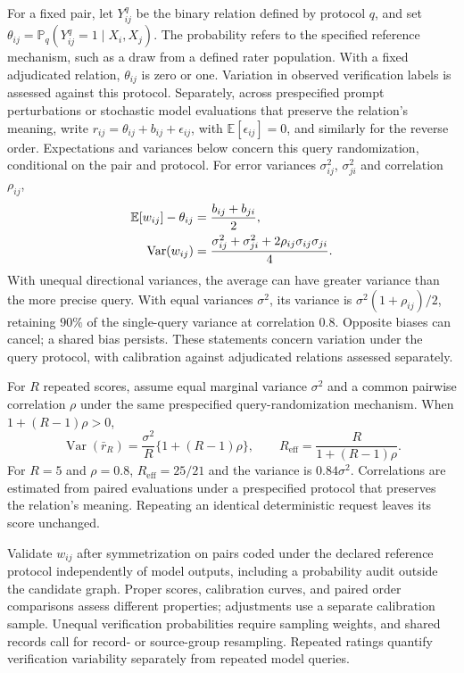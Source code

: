 \documentclass[11pt,a4paper]{article}
\newcommand{\E}{\mathbb{E}}
\newcommand{\Prob}{\mathbb{P}}
\newcommand{\Var}{\operatorname{Var}}
\begin{document}
For a fixed pair, let $Y^q_{ij}$ be the binary relation defined by protocol $q$, and set $\theta_{ij}=\Prob_q(Y^q_{ij}=1\mid X_i,X_j)$. The probability refers to the specified reference mechanism, such as a draw from a defined rater population. With a fixed adjudicated relation, $\theta_{ij}$ is zero or one. Variation in observed verification labels is assessed against this protocol. Separately, across prespecified prompt perturbations or stochastic model evaluations that preserve the relation's meaning, write $r_{ij}=\theta_{ij}+b_{ij}+\epsilon_{ij}$, with $\E[\epsilon_{ij}]=0$, and similarly for the reverse order. Expectations and variances below concern this query randomization, conditional on the pair and protocol. For error variances $\sigma_{ij}^2$, $\sigma_{ji}^2$ and correlation $\rho_{ij}$,
\begin{align}
 \E[w_{ij}]-\theta_{ij}&=\frac{b_{ij}+b_{ji}}{2},\notag\\
 \Var(w_{ij})&=\frac{\sigma_{ij}^2+\sigma_{ji}^2
        +2\rho_{ij}\sigma_{ij}\sigma_{ji}}{4}.
 \label{eq:weight-variance}
\end{align}
With unequal directional variances, the average can have greater variance than the more precise query. With equal variances $\sigma^2$, its variance is $\sigma^2(1+\rho_{ij})/2$, retaining $90\%$ of the single-query variance at correlation $0.8$. Opposite biases can cancel; a shared bias persists. These statements concern variation under the query protocol, with calibration against adjudicated relations assessed separately.

For $R$ repeated scores, assume equal marginal variance $\sigma^2$ and a common pairwise correlation $\rho$ under the same prespecified query-randomization mechanism. When $1+(R-1)\rho>0$,
\begin{equation}
 \Var(\bar r_R)=\frac{\sigma^2}{R}\{1+(R-1)\rho\},\qquad
 R_{\mathrm{eff}}=\frac{R}{1+(R-1)\rho}.
 \label{eq:query-repeats}
\end{equation}
For $R=5$ and $\rho=0.8$, $R_{\mathrm{eff}}=25/21$ and the variance is $0.84\sigma^2$. Correlations are estimated from paired evaluations under a prespecified protocol that preserves the relation's meaning. Repeating an identical deterministic request leaves its score unchanged.

Validate $w_{ij}$ after symmetrization on pairs coded under the declared reference protocol independently of model outputs, including a probability audit outside the candidate graph. Proper scores, calibration curves, and paired order comparisons assess different properties; adjustments use a separate calibration sample. Unequal verification probabilities require sampling weights, and shared records call for record- or source-group resampling. Repeated ratings quantify verification variability separately from repeated model queries.
\end{document}

